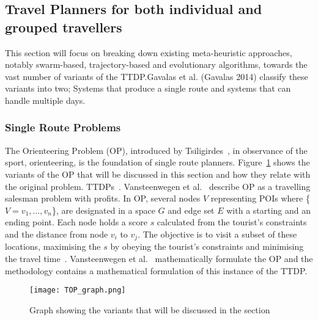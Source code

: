 \subsection{Travel Planners for both individual and grouped travellers}

This section will focus on breaking down existing meta-heuristic approaches,
notably swarm-based, trajectory-based and evolutionary algorithms, towards the
vast number of variants of the TTDP.\@ Gavalas et al. (Gavalas 2014) classify
these variants into two; Systems that produce a single route and systems that
can handle multiple days. 


\subsubsection{Single Route Problems}

The Orienteering Problem (OP), introduced by Tsiligirdes~\cite{Tsiligirides1984},
in observance of the sport, orienteering, is the foundation of single route planners. 
Figure~\ref{variants} shows the variants of the OP that will be discussed in
this section and how they relate with the original problem.
TTDPs~\cite{Herzog2020}. Vansteenwegen et al.~\cite{Vansteenwegen2011b} describe
OP as a travelling salesman problem with profits. In OP, several nodes $V$
representing POIs where \{$V= {v_1,\ldots,v_n}$\}, are designated in a space
$G$ and edge set $E$ with a starting and an ending
point. Each node holds a score $s$ calculated from the tourist's constraints
and the distance from node $v_i$ to $v_j$. The
objective is to visit a subset of these locations, maximising the $s$ by
obeying the tourist's constraints and minimising the travel
time~\cite{Sylejmani2017}. Vansteenwegen et al.~\cite{Vansteenwegen2011}
mathematically formulate the OP and the methodology contains a mathematical formulation
of this instance of the TTDP.\@

\begin{figure}[h]
\centering
\texttt{[image: TOP\_graph.png]}
\caption{Graph showing the variants that will be discussed in the section}
\label{variants}
\end{figure}

